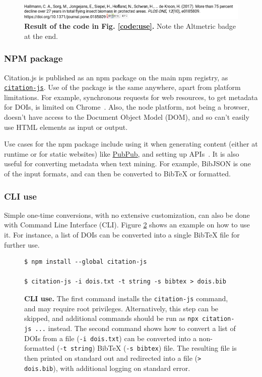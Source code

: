 \documentclass[fleqn,10pt,lineno]{wlpeerj} %
\begin{document}
\begin{figure}[ht]
\centering
\includegraphics[width=\linewidth]{figures/use_altmetric.png}
\caption{\textbf{Result of the code in Fig. \ref{code:use}.} Note the Altmetric badge at the end.}
\label{fig:use}
\end{figure}

\subsubsection*{NPM package}

Citation.js is published as an npm package on the main npm registry, as \href{https://npm.im/citation-js}{\texttt{citation-js}}. Use of the package is the same anywhere, apart from platform limitations. For example, synchronous requests for web resources, to get metadata for DOIs, is limited on Chrome~\citep{willighagen_make_2017}. Also, the node platform, not being a browser, doesn't have access to the Document Object Model (DOM), and so can't easily use HTML elements as input or output.

Use cases for the npm package include using it when generating content (either at runtime or for static websites) like \href{https://www.pubpub.org/}{PubPub}, and setting up APIs~\citep{willighagen_citation.js:_2017}. It is also useful for converting metadata when text mining. For example, BibJSON is one of the input formats, and can then be converted to BibTeX or formatted.

\subsubsection*{CLI use}

Simple one-time conversions, with no extensive customization, can also be done with Command Line Interface (CLI). Figure \ref{code:cli} shows an example on how to use it. For instance, a list of DOIs can be converted into a single BibTeX file for further use.

\begin{figure}[ht]
\centering
\begin{verbatim}
$ npm install --global citation-js

$ citation-js -i dois.txt -t string -s bibtex > dois.bib
\end{verbatim}
\caption{\textbf{CLI use.}
The first command installs the \texttt{citation-js} command, and may require root privileges. Alternatively, this step can be skipped, and additional commands should be run as \texttt{npx citation-js ...} instead. The second command shows how to convert a list of DOIs from a file (\texttt{-i dois.txt}) can be converted into a non-formatted (\texttt{-t string}) BibTeX (\texttt{-s bibtex}) file. The resulting file is then printed on standard out and redirected into a file (\texttt{> dois.bib}), with additional logging on standard error.
}
\label{code:cli}
\end{figure}
\end{document}
